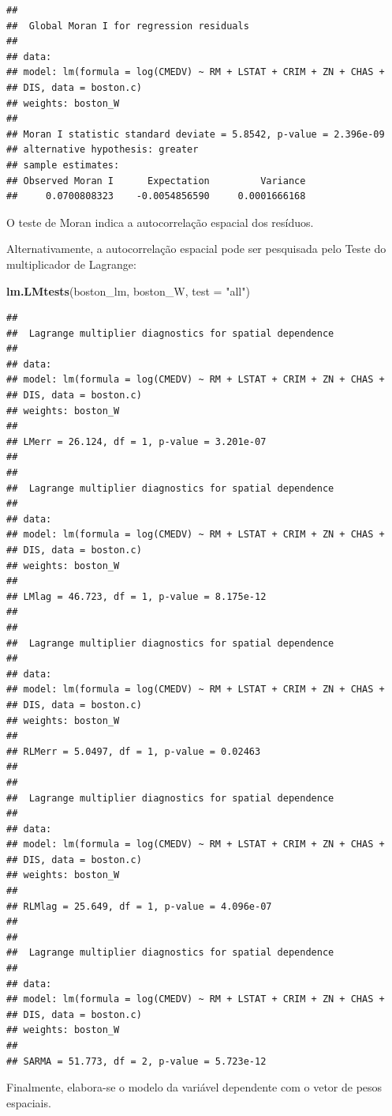 \documentclass[12pt,]{article}
\newenvironment{Shaded}{\begin{snugshade}}{\end{snugshade}}
\newcommand{\KeywordTok}[1]{\textcolor[rgb]{0.13,0.29,0.53}{\textbf{{#1}}}}
\newcommand{\DataTypeTok}[1]{\textcolor[rgb]{0.13,0.29,0.53}{{#1}}}
\newcommand{\StringTok}[1]{\textcolor[rgb]{0.31,0.60,0.02}{{#1}}}
\newcommand{\NormalTok}[1]{{#1}}
\begin{document}
\begin{verbatim}
## 
##  Global Moran I for regression residuals
## 
## data:  
## model: lm(formula = log(CMEDV) ~ RM + LSTAT + CRIM + ZN + CHAS +
## DIS, data = boston.c)
## weights: boston_W
## 
## Moran I statistic standard deviate = 5.8542, p-value = 2.396e-09
## alternative hypothesis: greater
## sample estimates:
## Observed Moran I      Expectation         Variance 
##     0.0700808323    -0.0054856590     0.0001666168
\end{verbatim}

O teste de Moran indica a autocorrelação espacial dos resíduos.

Alternativamente, a autocorrelação espacial pode ser pesquisada pelo
Teste do multiplicador de Lagrange:

\begin{Shaded}
\begin{Highlighting}[]
\KeywordTok{lm.LMtests}\NormalTok{(boston_lm, boston_W, }\DataTypeTok{test =} \StringTok{"all"}\NormalTok{)}
\end{Highlighting}
\end{Shaded}

\begin{verbatim}
## 
##  Lagrange multiplier diagnostics for spatial dependence
## 
## data:  
## model: lm(formula = log(CMEDV) ~ RM + LSTAT + CRIM + ZN + CHAS +
## DIS, data = boston.c)
## weights: boston_W
## 
## LMerr = 26.124, df = 1, p-value = 3.201e-07
## 
## 
##  Lagrange multiplier diagnostics for spatial dependence
## 
## data:  
## model: lm(formula = log(CMEDV) ~ RM + LSTAT + CRIM + ZN + CHAS +
## DIS, data = boston.c)
## weights: boston_W
## 
## LMlag = 46.723, df = 1, p-value = 8.175e-12
## 
## 
##  Lagrange multiplier diagnostics for spatial dependence
## 
## data:  
## model: lm(formula = log(CMEDV) ~ RM + LSTAT + CRIM + ZN + CHAS +
## DIS, data = boston.c)
## weights: boston_W
## 
## RLMerr = 5.0497, df = 1, p-value = 0.02463
## 
## 
##  Lagrange multiplier diagnostics for spatial dependence
## 
## data:  
## model: lm(formula = log(CMEDV) ~ RM + LSTAT + CRIM + ZN + CHAS +
## DIS, data = boston.c)
## weights: boston_W
## 
## RLMlag = 25.649, df = 1, p-value = 4.096e-07
## 
## 
##  Lagrange multiplier diagnostics for spatial dependence
## 
## data:  
## model: lm(formula = log(CMEDV) ~ RM + LSTAT + CRIM + ZN + CHAS +
## DIS, data = boston.c)
## weights: boston_W
## 
## SARMA = 51.773, df = 2, p-value = 5.723e-12
\end{verbatim}

Finalmente, elabora-se o modelo da variável dependente com o vetor de
pesos espaciais.
\end{document}
